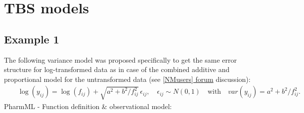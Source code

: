 \documentclass[a4paper,10pt]{article}
\begin{document}
\newpage
\section{TBS models}


\subsection{Example 1} 
The following variance model was proposed specifically to get the same error structure for log-transformed data as in case of the combined additive and proportional model for the untransformed data (see
\href{http://www.cognigencorp.com/nonmem/nm/99apr232002.html}{[NMusers] forum} discussion):	
\begin{eqnarray}
&& \log(y_{ij}) = \log(f_{ij}) + \sqrt{a^2 + b^2/f_{ij}^2}\,\epsilon_{ij}, \quad \epsilon_{ij} \sim N(0,1) \quad \text{with} \quad \mathit{var}(y_{ij}) = a^2 + b^2/f_{ij}^2. \nonumber
\end{eqnarray}
PharmML - Function definition \& observational model:
\end{document}
